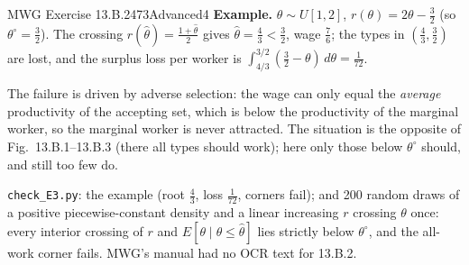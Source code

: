 \begin{exsol}{MWG Exercise 13.B.2}{473}{Advanced}{4}
\textbf{Example.} $\theta\sim U[1,2]$, $r(\theta)=2\theta-\tfrac32$ (so $\theta^\circ=\tfrac32$). The
crossing $r(\hat\theta)=\tfrac{1+\hat\theta}2$ gives $\hat\theta=\tfrac43<\tfrac32$, wage $\tfrac76$;
the types in $(\tfrac43,\tfrac32)$ are lost, and the surplus loss per worker is
$\int_{4/3}^{3/2}(\tfrac32-\theta)\,d\theta=\tfrac1{72}$.

\interp The failure is driven by adverse selection: the wage can only equal the \emph{average}
productivity of the accepting set, which is below the productivity of the marginal worker, so
the marginal worker is never attracted. The situation is the opposite of Fig.~13.B.1--13.B.3
(there all types should work); here only those below $\theta^\circ$ should, and still too few do.

\verify \texttt{check\_E3.py}: the example (root $\tfrac43$, loss $\tfrac1{72}$, corners fail); and 200 random
draws of a positive piecewise-constant density and a linear increasing $r$ crossing $\theta$ once:
every interior crossing of $r$ and $E[\theta\mid\theta\le\hat\theta]$ lies strictly below $\theta^\circ$, and the all-work
corner fails. MWG's manual had no OCR text for 13.B.2.

\end{exsol}
